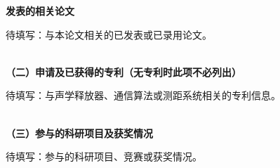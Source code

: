 \begin{publication}
\noindent\textbf{发表的相关论文}
\begin{publist}
\item 待填写：与本论文相关的已发表或已录用论文。
\end{publist}

~\\

\noindent\textbf{（二）申请及已获得的专利（无专利时此项不必列出）}
\begin{publist}
\item 待填写：与声学释放器、通信算法或测距系统相关的专利信息。
\end{publist}

~\\

\noindent\textbf{（三）参与的科研项目及获奖情况}
\begin{publist}
\item 待填写：参与的科研项目、竞赛或获奖情况。
\end{publist}
\end{publication}
